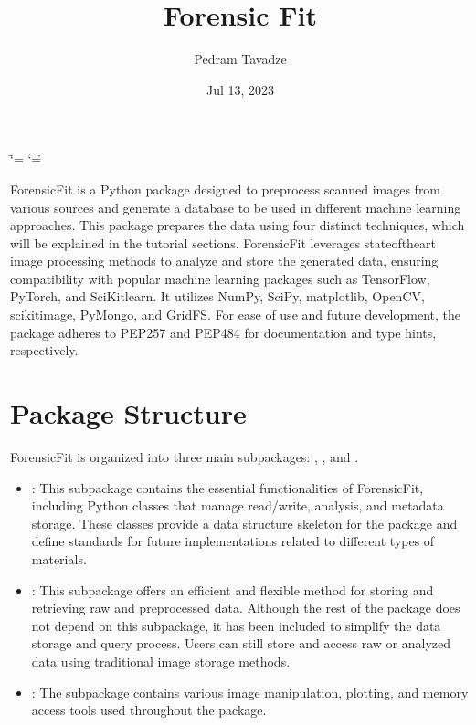 \documentclass[letterpaper,10pt,english]{sphinxmanual}
\title{Forensic Fit}
\date{Jul 13, 2023}
\author{Pedram Tavadze}
\begin{document}
\ifdefined\shorthandoff
  \ifnum\catcode`\=\string=\active\shorthandoff{=}\fi
  \ifnum\catcode`\"=\active{}\fi
\fi

\pagestyle{empty}
\sphinxmaketitle
\pagestyle{plain}
\sphinxtableofcontents
\pagestyle{normal}
\label{\detokenize{index::doc}}


\sphinxAtStartPar
ForensicFit is a Python package designed to preprocess scanned images from various sources and generate a database to be used in different machine learning approaches. This package prepares the data using four distinct techniques, which will be explained in the tutorial sections. ForensicFit leverages state\sphinxhyphen{}of\sphinxhyphen{}the\sphinxhyphen{}art image processing methods to analyze and store the generated data, ensuring compatibility with popular machine learning packages such as TensorFlow, PyTorch, and SciKit\sphinxhyphen{}learn. It utilizes NumPy, SciPy, matplotlib, OpenCV, scikit\sphinxhyphen{}image, PyMongo, and GridFS. For ease of use and future development, the package adheres to PEP\sphinxhyphen{}257 and PEP\sphinxhyphen{}484 for documentation and type hints, respectively.


\chapter{Package Structure}
\label{\detokenize{index:package-structure}}
\sphinxAtStartPar
ForensicFit is organized into three main sub\sphinxhyphen{}packages: , , and .
\begin{itemize}
\item {} 
\sphinxAtStartPar
{}: This sub\sphinxhyphen{}package contains the essential functionalities of ForensicFit, including Python classes that manage read/write, analysis, and metadata storage. These classes provide a data structure skeleton for the package and define standards for future implementations related to different types of materials.

\item {} 
\sphinxAtStartPar
{}: This sub\sphinxhyphen{}package offers an efficient and flexible method for storing and retrieving raw and preprocessed data. Although the rest of the package does not depend on this sub\sphinxhyphen{}package, it has been included to simplify the data storage and query process. Users can still store and access raw or analyzed data using traditional image storage methods.

\item {} 
\sphinxAtStartPar
{}: The  sub\sphinxhyphen{}package contains various image manipulation, plotting, and memory access tools used throughout the package.

\end{itemize}
\end{document}
